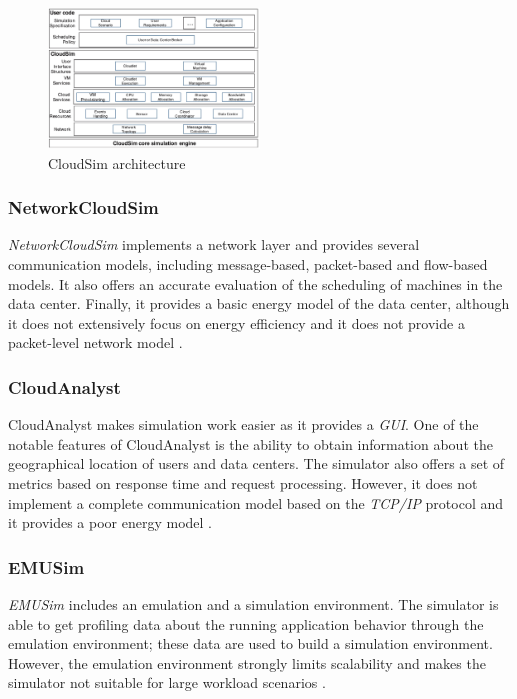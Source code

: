 {\begin{itemize}
\end{itemize}
\begin{figure}[h]
    \centering
    \includegraphics[width=0.5\textwidth]{capitoli/images/cloudsim_arch.jpeg}
    \caption{CloudSim architecture}
    \label{fig:cloudsim_arch}
\end{figure}
\subsubsection{NetworkCloudSim}
\emph{NetworkCloudSim} \cite{garg2011networkcloudsim} implements a network layer and  provides several communication models, including message-based, packet-based and flow-based models. It also offers an accurate evaluation of the scheduling of machines in the data center. Finally, it provides a basic energy model of the data center, although it does not extensively focus on energy efficiency and it does not provide a packet-level network model \cite{mansouri2020cloud} \cite{patel2016comprehensive}.
\subsubsection*{CloudAnalyst}
CloudAnalyst \cite{wickremasinghe2010cloudanalyst} makes simulation work easier as it provides a \emph{GUI}. One of the notable features of CloudAnalyst is the ability to obtain information about the geographical location of users and data centers. The simulator also offers a set of metrics based on response time and request processing. However, it does not implement a complete communication model based on the \emph{TCP/IP} protocol and it provides a poor energy model \cite{mansouri2020cloud}. 
\subsubsection{EMUSim}
\emph{EMUSim} \cite{calheiros2013emusim} includes an emulation and a simulation environment. The simulator is able to get profiling data about the running application behavior through the emulation environment; these data are used to build a simulation environment. However, the emulation environment strongly limits scalability and makes the simulator not suitable for large workload scenarios \cite{mansouri2020cloud}. 
}
